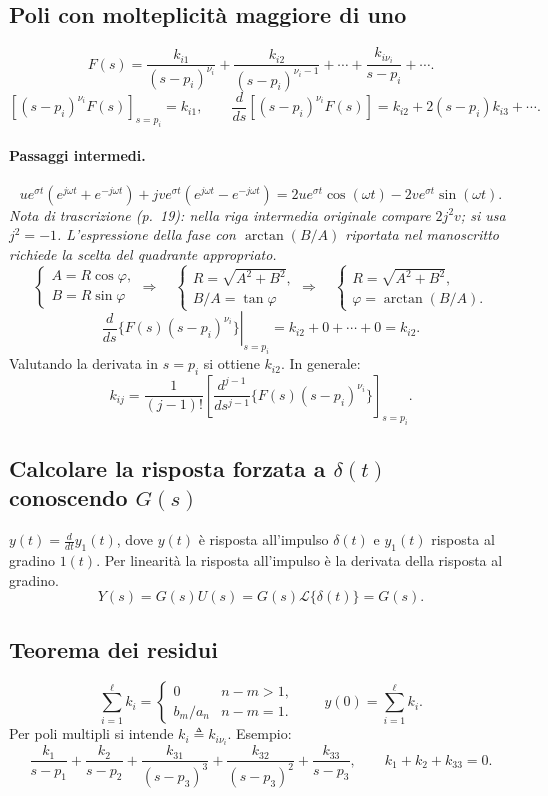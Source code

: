 \subsection*{Poli con molteplicità maggiore di uno}
\[F(s)=\frac{k_{i1}}{(s-p_i)^{\nu_i}}+\frac{k_{i2}}{(s-p_i)^{\nu_i-1}}+\cdots+\frac{k_{i\nu_i}}{s-p_i}+\cdots.\]
\[[(s-p_i)^{\nu_i}F(s)]_{s=p_i}=k_{i1},\qquad \frac d{ds}[(s-p_i)^{\nu_i}F(s)]=k_{i2}+2(s-p_i)k_{i3}+\cdots.\]
\paragraph{Passaggi intermedi.}
\[u e^{\sigma t}(e^{j\omega t}+e^{-j\omega t})
+jv e^{\sigma t}(e^{j\omega t}-e^{-j\omega t})
=2u e^{\sigma t}\cos(\omega t)-2v e^{\sigma t}\sin(\omega t).\]
\emph{Nota di trascrizione (p.~19): nella riga intermedia originale compare $2j^2v$; si usa $j^2=-1$. L'espressione della fase con $\arctan(B/A)$ riportata nel manoscritto richiede la scelta del quadrante appropriato.}
\[\begin{cases}A=R\cos\varphi,\\B=R\sin\varphi\end{cases}
\Longrightarrow\quad
\begin{cases}R=\sqrt{A^2+B^2},\\B/A=\tan\varphi\end{cases}
\Longrightarrow\quad
\begin{cases}R=\sqrt{A^2+B^2},\\\varphi=\arctan(B/A).\end{cases}\]
\[\left.\frac d{ds}\{F(s)(s-p_i)^{\nu_i}\}\right|_{s=p_i}
=k_{i2}+0+\cdots+0=k_{i2}.\]
Valutando la derivata in $s=p_i$ si ottiene $k_{i2}$. In generale:
\[k_{ij}=\frac1{(j-1)!}\left[\frac{d^{j-1}}{ds^{j-1}}\{F(s)(s-p_i)^{\nu_i}\}\right]_{s=p_i}.\]
\subsection*{Calcolare la risposta forzata a $\delta(t)$ conoscendo $G(s)$}
$y(t)=\frac d{dt}y_1(t)$, dove $y(t)$ è risposta all'impulso $\delta(t)$ e $y_1(t)$ risposta al gradino $1(t)$. Per linearità la risposta all'impulso è la derivata della risposta al gradino.
\[Y(s)=G(s)U(s)=G(s)\mathcal L\{\delta(t)\}=G(s).\]
\subsection*{Teorema dei residui}
\[\sum_{i=1}^{\ell}k_i=\begin{cases}0&n-m>1,\\b_m/a_n&n-m=1.\end{cases}\qquad y(0)=\sum_{i=1}^{\ell}k_i.\]
Per poli multipli si intende $k_i\triangleq k_{i\nu_i}$. Esempio:
\[\frac{k_1}{s-p_1}+\frac{k_2}{s-p_2}+\frac{k_{31}}{(s-p_3)^3}+\frac{k_{32}}{(s-p_3)^2}+\frac{k_{33}}{s-p_3},\qquad k_1+k_2+k_{33}=0.\]

